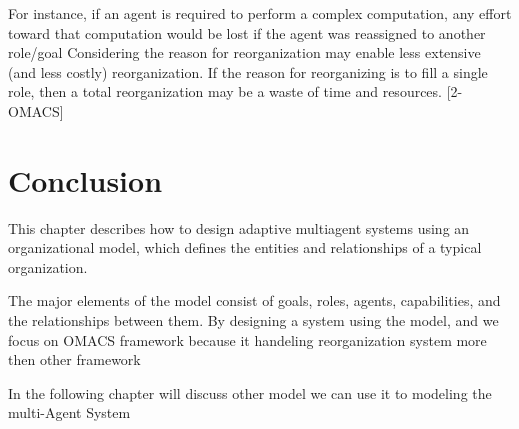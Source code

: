 For instance, if an agent is required to perform a complex computation, any effort toward that computation
would be lost if the agent was reassigned to another role/goal Considering the reason for
reorganization may enable less extensive (and less costly) reorganization. If the reason for
reorganizing is to fill a single role, then a total reorganization may be a waste of time and
resources. [2-OMACS]

\pagebreak

\section{Conclusion}

This chapter describes how to design adaptive multiagent
systems using an organizational model, which defines the
entities and relationships of a typical organization.

 The major elements of the model consist of goals, roles, agents,
capabilities, and the relationships between them. By
designing a system using the model, and we focus on OMACS framework
because it handeling reorganization system more then other framework

In the following chapter will discuss other model
we can use it to modeling the multi-Agent System
\textbf{}
